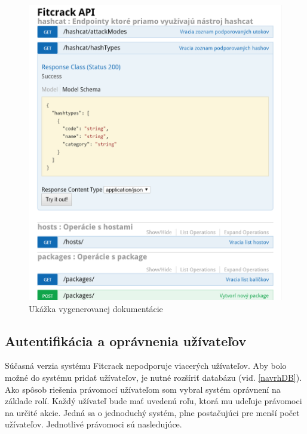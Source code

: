 \documentclass[slovak]{fitthesis}
\begin{document}
\begin{figure}[H]
    \centering
    \includegraphics[scale=0.45]{obrazky/doc.PNG}
    \caption{Ukážka vygenerovanej dokumentácie}
    \label{fig:doc}
\end{figure}

\subsection{Autentifikácia a oprávnenia užívateľov}
Súčasná verzia systému Fitcrack nepodporuje viacerých užívateľov. Aby bolo možné do systému pridať užívateľov, je nutné rozšíriť databázu (viď. \ref{navrhDB}). Ako spôsob riešenia právomocí užívateľom som vybral systém oprávnení na základe rolí. Každý užívateľ bude mať uvedenú roľu, ktorá mu udeľuje právomoci na určité akcie. Jedná sa o jednoduchý systém, plne postačujúci pre menší počet užívateľov. Jednotlivé právomoci sú nasledujúce.
\end{document}
